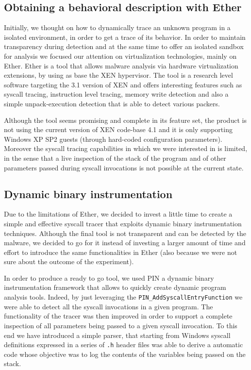\documentclass{article}
\begin{document}
\subsection{Obtaining a behavioral description with Ether}

Initially, we thought on how to dynamically trace an unknown program in a isolated environment, in order to get a trace of its behavior. In order to maintain transparency during detection and at the same time to offer an isolated sandbox for analysis we focused our attention on virtualization technologies, mainly on Ether. Ether is a tool that allows malware analysis via hardware virtualization extensions, by using as base the XEN hypervisor. The tool is a research level software targeting the 3.1 version of XEN and offers interesting features such as syscall tracing, instruction level tracing, memory write detection and also a simple unpack-execution detection that is able to detect various packers.

Although the tool seems promising and complete in its feature set, the product is not using the current version of XEN code-base 4.1 and it is only supporting Windows XP SP2 guests (through hard-coded configuration parameters). Moreover the syscall tracing capabilities in which we were interested in is limited, in the sense that a live inspection of the stack of the program and of other parameters passed during syscall invocations is not possible at the current state.

\subsection{Dynamic binary instrumentation}

Due to the limitations of Ether, we decided to invest a little time to create a simple and effective syscall tracer that exploits dynamic binary instrumentation techniques. Although the final tool is not transparent and can be detected by the malware, we decided to go for it instead of investing a larger amount of time and effort to introduce the same functionalities in Ether (also because we were not sure about the outcome of the experiment).

In order to produce a ready to go tool, we used PIN a dynamic binary instrumentation framework that allows to quickly create dynamic program analysis tools. Indeed, by just leveraging the \texttt{PIN\_AddSyscallEntryFunction} we were able to detect all the syscall invocations in a given program. The functionality of the tracer was then improved in order to support a complete inspection of all parameters being passed to a given syscall invocation. To this end we have introduced a simple parser, that starting from Windows syscall definitions expressed in a series of \texttt{.h} header files was able to derive a automatic code whose objective was to log the contents of the variables being passed on the stack.
\end{document}
